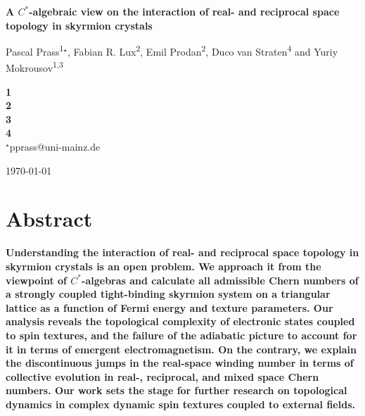 \documentclass[submission, Phys]{SciPost}
\begin{document}
\begin{center}{\Large \textbf{
 A $C^\ast$-algebraic view on the interaction of real- and reciprocal space topology in skyrmion crystals
}}\end{center}

\begin{center}
Pascal Prass\textsuperscript{1}${}^\star$,
Fabian R. Lux\textsuperscript{2},
Emil Prodan\textsuperscript{2},
Duco van Straten\textsuperscript{4} and
Yuriy Mokrousov\textsuperscript{1,3}
\end{center}

\begin{center}
{\bf 1} \mainzP
\\
{\bf 2} \nyc
\\
{\bf 3} \pgi
\\
{\bf 4} \mainzM
\\
${}^\star${\small \sf pprass@uni-mainz.de}
\end{center}

\begin{center}
\today
\end{center}


\section*{Abstract}
{\bf
Understanding the interaction of real- and reciprocal space topology in skyrmion crystals is an open problem.
We approach it from the viewpoint of $C^\ast$-algebras and calculate all admissible Chern numbers of a strongly coupled tight-binding skyrmion system on a triangular lattice as a function of Fermi energy and texture parameters.
Our analysis reveals the topological complexity of electronic states coupled to spin textures, and the failure of the adiabatic picture to account for it in terms of emergent electromagnetism. On the contrary, we explain the discontinuous jumps in the real-space winding number in terms of collective evolution in real-, reciprocal, and mixed space Chern numbers. Our work sets the stage for further research on topological dynamics in complex dynamic spin textures coupled to external fields.
}
\end{document}

